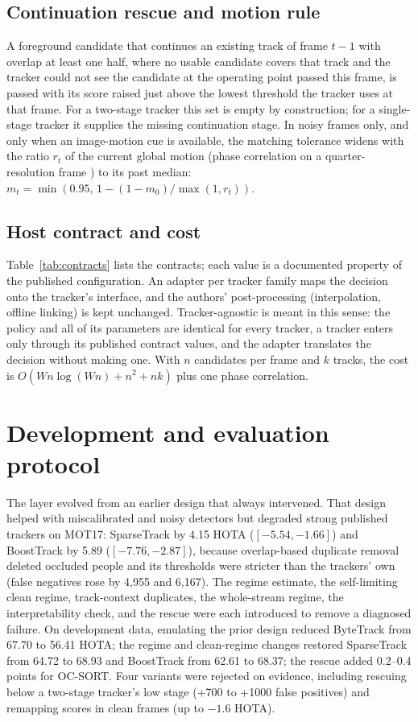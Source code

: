 \documentclass[pdflatex,sn-mathphys-num,iicol]{sn-jnl}
\begin{document}
\subsection{Continuation rescue and motion rule}
A foreground candidate that continues an existing track of frame $t-1$ with overlap at least one half, where no usable candidate covers that track and the tracker could not see the candidate at the operating point passed this frame, is passed with its score raised just above the lowest threshold the tracker uses at that frame. For a two-stage tracker this set is empty by construction; for a single-stage tracker it supplies the missing continuation stage. In noisy frames only, and only when an image-motion cue is available, the matching tolerance widens with the ratio $r_t$ of the current global motion (phase correlation on a quarter-resolution frame \cite{reddy1996phasecorr}) to its past median: $m_t=\min\left(0.95,\,1-(1-m_0)/\max(1,r_t)\right)$.

\subsection{Host contract and cost}
Table~\ref{tab:contracts} lists the contracts; each value is a documented property of the published configuration. An adapter per tracker family maps the decision onto the tracker's interface, and the authors' post-processing (interpolation, offline linking) is kept unchanged. Tracker-agnostic is meant in this sense: the policy and all of its parameters are identical for every tracker, a tracker enters only through its published contract values, and the adapter translates the decision without making one. With $n$ candidates per frame and $k$ tracks, the cost is $O(Wn\log(Wn)+n^2+nk)$ plus one phase correlation.



\section{Development and evaluation protocol}\label{sec:protocol}
The layer evolved from an earlier design that always intervened. That design helped with miscalibrated and noisy detectors but degraded strong published trackers on MOT17: SparseTrack by 4.15 HOTA ($[-5.54,-1.66]$) and BoostTrack by 5.89 ($[-7.76,-2.87]$), because overlap-based duplicate removal deleted occluded people and its thresholds were stricter than the trackers' own (false negatives rose by 4,955 and 6,167). The regime estimate, the self-limiting clean regime, track-context duplicates, the whole-stream regime, the interpretability check, and the rescue were each introduced to remove a diagnosed failure. On development data, emulating the prior design reduced ByteTrack from 67.70 to 56.41 HOTA; the regime and clean-regime changes restored SparseTrack from 64.72 to 68.93 and BoostTrack from 62.61 to 68.37; the rescue added 0.2--0.4 points for OC-SORT. Four variants were rejected on evidence, including rescuing below a two-stage tracker's low stage (+700 to +1000 false positives) and remapping scores in clean frames (up to $-1.6$ HOTA).
\end{document}
